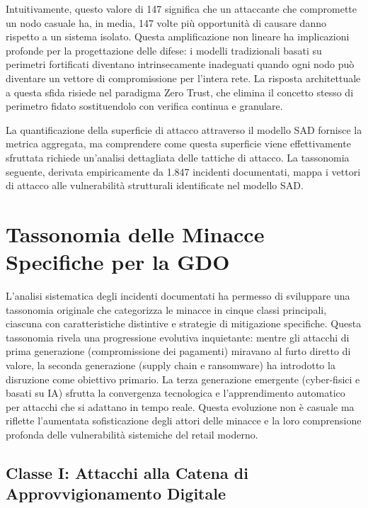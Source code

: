 Intuitivamente, questo valore di 147 significa che un attaccante che compromette un nodo casuale ha, in media, 147 volte più opportunità di causare danno rispetto a un sistema isolato. Questa amplificazione non lineare ha implicazioni profonde per la progettazione delle difese: i modelli tradizionali basati su perimetri fortificati diventano intrinsecamente inadeguati quando ogni nodo può diventare un vettore di compromissione per l'intera rete. La risposta architettuale a questa sfida risiede nel paradigma Zero Trust, che elimina il concetto stesso di perimetro fidato sostituendolo con verifica continua e granulare.

La quantificazione della superficie di attacco attraverso il modello SAD fornisce la metrica aggregata, ma comprendere come questa superficie viene effettivamente sfruttata richiede un'analisi dettagliata delle tattiche di attacco. La tassonomia seguente, derivata empiricamente da 1.847 incidenti documentati, mappa i vettori di attacco alle vulnerabilità strutturali identificate nel modello SAD.

\section{\texorpdfstring{Tassonomia delle Minacce Specifiche per la GDO}{2.3 - Tassonomia delle Minacce Specifiche per la GDO}}
\label{sec:tassonomia_minacce}

L'analisi sistematica degli incidenti documentati ha permesso di sviluppare una tassonomia originale che categorizza le minacce in cinque classi principali, ciascuna con caratteristiche distintive e strategie di mitigazione specifiche. Questa tassonomia rivela una progressione evolutiva inquietante: mentre gli attacchi di prima generazione (compromissione dei pagamenti) miravano al furto diretto di valore, la seconda generazione (supply chain e ransomware) ha introdotto la disruzione come obiettivo primario. La terza generazione emergente (cyber-fisici e basati su IA) sfrutta la convergenza tecnologica e l'apprendimento automatico per attacchi che si adattano in tempo reale. Questa evoluzione non è casuale ma riflette l'aumentata sofisticazione degli attori delle minacce e la loro comprensione profonda delle vulnerabilità sistemiche del retail moderno.

\subsection{\texorpdfstring{Classe I: Attacchi alla Catena di Approvvigionamento Digitale}{2.3.1 - Classe I: Attacchi alla Catena di Approvvigionamento Digitale}}

